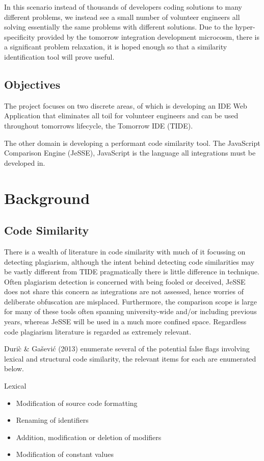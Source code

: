 \documentclass[jou,apacite]{apa6}
\begin{document}
In this scenario instead of thousands of developers coding solutions to many different problems, we instead see a small number of volunteer engineers all solving essentially the same problems with different solutions. Due to the hyper-specificity provided by the tomorrow integration development microcosm, there is a significant problem relaxation, it is hoped enough so that a similarity identification tool will prove useful.

\subsection{Objectives}
The project focuses on two discrete areas, 
 of which is developing an IDE Web Application that eliminates all toil for volunteer engineers and can be used throughout tomorrow\textquotesingle s lifecycle, the Tomorrow IDE (TIDE).

The other domain is developing a performant code similarity tool. The JavaScript Comparison Engine (JeSSE), JavaScript is the language all integrations must be developed in.

\section{Background}
\subsection{Code Similarity}
There is a wealth of literature in code similarity with much of it focussing on detecting plagiarism, although the intent behind detecting code similarities may be vastly different from TIDE pragmatically there is little difference in technique. Often plagiarism detection is concerned with being fooled or deceived, JeSSE does not share this concern as integrations are not assessed,  hence worries of deliberate obfuscation are misplaced. Furthermore, the comparison scope is large for many of these tools often spanning university-wide and/or including previous years, whereas JeSSE will be used in a much more confined space. Regardless code plagiarism literature is regarded as extremely relevant.

Duri\`c \& Gašević (2013) enumerate several of the potential false flags involving lexical and structural code similarity, the relevant items for each are enumerated below.

Lexical
\begin{itemize}
  \setlength\itemsep{-0.5em}
  \item Modification of source code formatting 
  \item Renaming of identifiers
  \item Addition, modification or deletion of modifiers
  \item Modification of constant values
\end{itemize}
\end{document}
